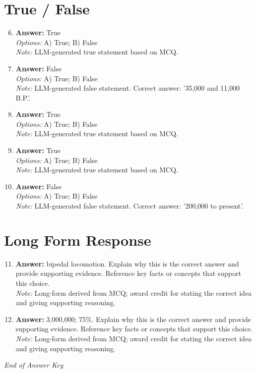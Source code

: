 \documentclass[12pt]{article}
\begin{document}
\section*{True / False}
\begin{enumerate}[label=\arabic*.]
\setcounter{enumi}{5}
\item \textbf{Answer:} True
\\ \textit{Options:} A) True; B) False
\\ \textit{Note:} LLM-generated true statement based on MCQ.
\item \textbf{Answer:} False
\\ \textit{Options:} A) True; B) False
\\ \textit{Note:} LLM-generated false statement. Correct answer: '35,000 and 11,000 B.P.'.
\item \textbf{Answer:} True
\\ \textit{Options:} A) True; B) False
\\ \textit{Note:} LLM-generated true statement based on MCQ.
\item \textbf{Answer:} True
\\ \textit{Options:} A) True; B) False
\\ \textit{Note:} LLM-generated true statement based on MCQ.
\item \textbf{Answer:} False
\\ \textit{Options:} A) True; B) False
\\ \textit{Note:} LLM-generated false statement. Correct answer: '200,000 to present'.
\end{enumerate}

\section*{Long Form Response}
\begin{enumerate}[label=\arabic*.]
\setcounter{enumi}{10}
\item \textbf{Answer:} bipedal locomotion. Explain why this is the correct answer and provide supporting evidence. Reference key facts or concepts that support this choice.
\\ \textit{Note:} Long-form derived from MCQ; award credit for stating the correct idea and giving supporting reasoning.
\item \textbf{Answer:} 3,000,000; 75\%. Explain why this is the correct answer and provide supporting evidence. Reference key facts or concepts that support this choice.
\\ \textit{Note:} Long-form derived from MCQ; award credit for stating the correct idea and giving supporting reasoning.
\end{enumerate}

\vfill
\noindent\textit{End of Answer Key}
\end{document}
